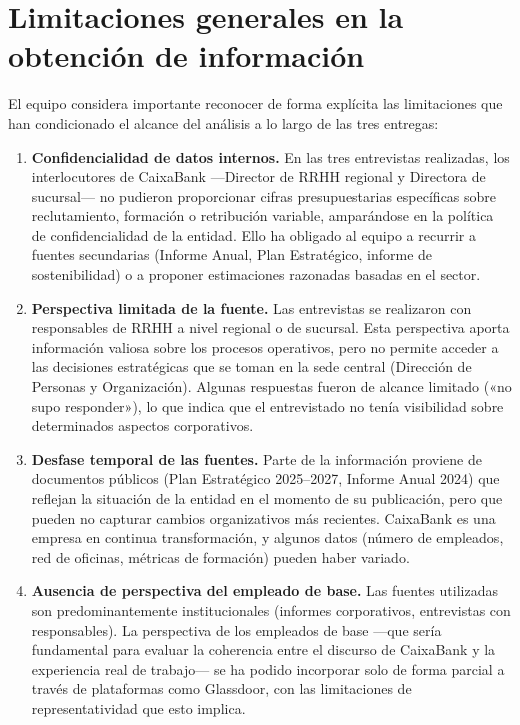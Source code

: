 \section{Limitaciones generales en la obtención de información}

El equipo considera importante reconocer de forma explícita las limitaciones
que han condicionado el alcance del análisis a lo largo de las tres entregas:

\begin{enumerate}

  \item \textbf{Confidencialidad de datos internos.}
        En las tres entrevistas realizadas, los interlocutores de CaixaBank
        —Director de RRHH regional y Directora de sucursal— no pudieron proporcionar
        cifras presupuestarias específicas sobre reclutamiento, formación o
        retribución variable, amparándose en la política de confidencialidad de
        la entidad. Ello ha obligado al equipo a recurrir a fuentes secundarias
        (Informe Anual, Plan Estratégico, informe de sostenibilidad) o a
        proponer estimaciones razonadas basadas en el sector.

  \item \textbf{Perspectiva limitada de la fuente.}
        Las entrevistas se realizaron con responsables de RRHH a nivel regional
        o de sucursal. Esta perspectiva aporta información valiosa sobre los
        procesos operativos, pero no permite acceder a las decisiones estratégicas
        que se toman en la sede central (Dirección de Personas y Organización).
        Algunas respuestas fueron de alcance limitado («no supo responder»),
        lo que indica que el entrevistado no tenía visibilidad sobre determinados
        aspectos corporativos.

  \item \textbf{Desfase temporal de las fuentes.}
        Parte de la información proviene de documentos públicos (Plan Estratégico
        2025--2027, Informe Anual 2024) que reflejan la situación de la entidad
        en el momento de su publicación, pero que pueden no capturar cambios
        organizativos más recientes. CaixaBank es una empresa en continua
        transformación, y algunos datos (número de empleados, red de oficinas,
        métricas de formación) pueden haber variado.

  \item \textbf{Ausencia de perspectiva del empleado de base.}
        Las fuentes utilizadas son predominantemente institucionales (informes
        corporativos, entrevistas con responsables). La perspectiva de los
        empleados de base —que sería fundamental para evaluar la coherencia
        entre el discurso de CaixaBank y la experiencia real de trabajo— se ha
        podido incorporar solo de forma parcial a través de plataformas como
        Glassdoor, con las limitaciones de representatividad que esto implica.

\end{enumerate}

